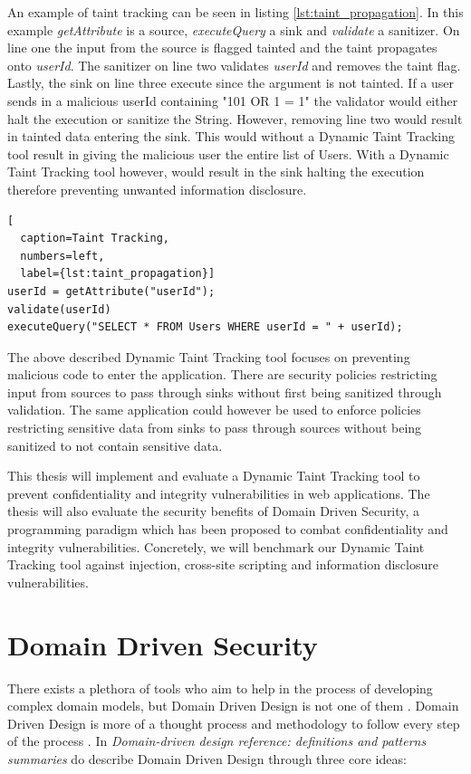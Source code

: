 An example of taint tracking can be seen in listing \ref{lst:taint_propagation}. In this example \textit{getAttribute} is a source, \textit{executeQuery} a sink and \textit{validate} a sanitizer. On line one the input from the source is flagged tainted and the taint propagates onto \textit{userId}. The sanitizer on line two validates \textit{userId} and removes the taint flag. Lastly, the sink on line three execute since the argument is not tainted. If a user sends in a malicious userId containing "101 OR 1 = 1" the validator would either halt the execution or sanitize the String. However, removing line two would result in tainted data entering the sink. This would without a Dynamic Taint Tracking tool result in giving the malicious user the entire list of Users. With a Dynamic Taint Tracking tool however, would result in the sink halting the execution therefore preventing unwanted information disclosure.

\hfill
\begin{lstlisting}[
  caption=Taint Tracking,
  numbers=left,
  label={lst:taint_propagation}]
userId = getAttribute("userId");
validate(userId)
executeQuery("SELECT * FROM Users WHERE userId = " + userId);
\end{lstlisting}
\hfill

The above described Dynamic Taint Tracking tool focuses on preventing malicious code to enter the application. There are security policies restricting input from sources to pass through sinks without first being sanitized through validation. The same application could however be used to enforce policies restricting sensitive data from sinks to pass through sources without being sanitized to not contain sensitive data. 

This thesis will implement and evaluate a Dynamic Taint Tracking tool to prevent confidentiality and integrity vulnerabilities in web applications. The thesis will also evaluate the security benefits of Domain Driven Security, a programming paradigm which has been proposed to combat confidentiality and integrity vulnerabilities. Concretely, we will benchmark our Dynamic Taint Tracking tool against injection, cross-site scripting and information disclosure vulnerabilities.


\section{Domain Driven Security}
\label{DomainDrivenSecurity}
There exists a plethora of tools who aim to help in the process of developing complex domain models, but Domain Driven Design is not one of them \parencite{Bankes, 10.1007/978-3-319-24309-2_33}. Domain Driven Design is more of a thought process and methodology to follow every step of the process \parencite{EvansEric2004Dd:t}. In \emph{Domain-driven design reference: definitions and patterns summaries} do \textcite{evans_2015} describe Domain Driven Design through three core ideas:

